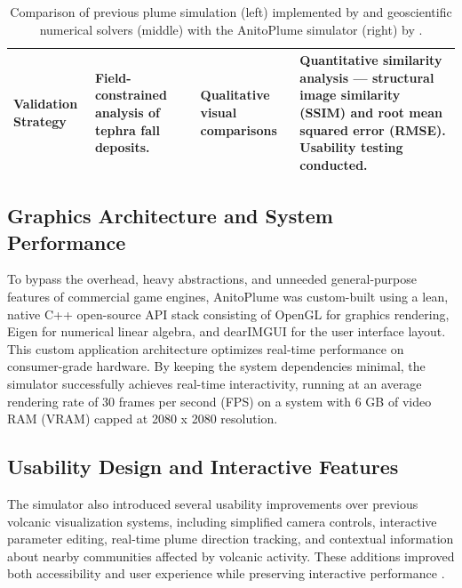 \begin{table}[htbp]
{\begin{tabularx}{1.65\textwidth}{>{\raggedright\arraybackslash\bfseries}p{3cm} X X X}
            Validation Strategy 
            & Field-constrained analysis of tephra fall deposits. 
            & Qualitative visual comparisons 
            & Quantitative similarity analysis --- structural image similarity (SSIM) and root mean squared error (RMSE). Usability testing conducted. \\
            
            \bottomrule
        \end{tabularx}
    }

    \caption{Comparison of previous plume simulation (left) implemented by \protect{} and geoscientific numerical solvers (middle) with the AnitoPlume simulator (right) by \protect{}.}
    \label{tab:simulation_comparison} 
\end{table}


\subsection{Graphics Architecture and System Performance}
To bypass the overhead, heavy abstractions, and unneeded general-purpose features of commercial game engines, AnitoPlume was custom-built using a lean, native C++ open-source API stack consisting of OpenGL for graphics rendering, Eigen for numerical linear algebra, and dearIMGUI for the user interface layout.
This custom application architecture optimizes real-time performance on consumer-grade hardware.
By keeping the system dependencies minimal, the simulator successfully achieves real-time interactivity, running at an average rendering rate of 30 frames per second (FPS) on a system with 6 GB of video RAM (VRAM) capped at 2080 x 2080 resolution\cite{del2026interactive}.

\subsection{Usability Design and Interactive Features}
The simulator also introduced several usability improvements over previous volcanic visualization systems, including simplified camera controls, interactive parameter editing, real-time plume direction tracking, and contextual information about nearby communities affected by volcanic activity.
These additions improved both accessibility and user experience while preserving interactive performance \cite{del2026interactive}.

